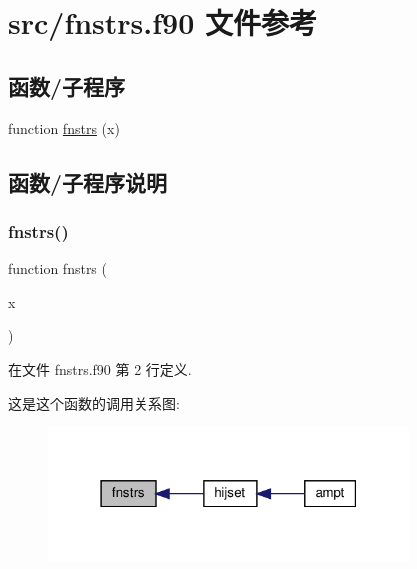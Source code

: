 \hypertarget{fnstrs_8f90}{}\section{src/fnstrs.f90 文件参考}
\label{fnstrs_8f90}
\subsection*{函数/子程序}
\begin{DoxyCompactItemize}
\item 
function \mbox{\hyperlink{fnstrs_8f90_af610dfc36108366d88ed8cb56b36527a}{fnstrs}} (x)
\end{DoxyCompactItemize}


\subsection{函数/子程序说明}
\mbox{\label{fnstrs_8f90_af610dfc36108366d88ed8cb56b36527a}} 
\subsubsection{\texorpdfstring{fnstrs()}{fnstrs()}}
{\footnotesize\ttfamily function fnstrs (\begin{DoxyParamCaption}\item[{}]{x }\end{DoxyParamCaption})}



在文件 fnstrs.\+f90 第 2 行定义.

这是这个函数的调用关系图\+:
\nopagebreak
\begin{figure}[H]
\begin{center}
\leavevmode
\includegraphics[width=271pt]{fnstrs_8f90_af610dfc36108366d88ed8cb56b36527a_icgraph}
\end{center}
\end{figure}
